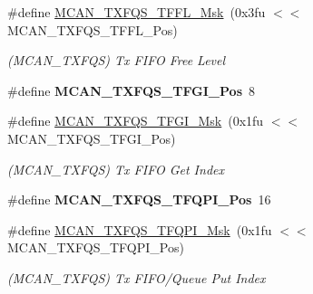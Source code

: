 \begin{DoxyCompactItemize}
\item 
\mbox{\label{group__SAMV71__MCAN_ga499e086f227cc16cb1efafb8ac11cf57}} 
\#define \mbox{\hyperlink{group__SAMV71__MCAN_ga499e086f227cc16cb1efafb8ac11cf57}{M\+C\+A\+N\+\_\+\+T\+X\+F\+Q\+S\+\_\+\+T\+F\+F\+L\+\_\+\+Msk}}~(0x3fu $<$$<$ M\+C\+A\+N\+\_\+\+T\+X\+F\+Q\+S\+\_\+\+T\+F\+F\+L\+\_\+\+Pos)
\begin{DoxyCompactList}\small\item\em (M\+C\+A\+N\+\_\+\+T\+X\+F\+QS) Tx F\+I\+FO Free Level \end{DoxyCompactList}\item 
\mbox{\label{group__SAMV71__MCAN_ga253f4a1ad728a7925be42b09de6bd7bc}} 
\#define {\bfseries M\+C\+A\+N\+\_\+\+T\+X\+F\+Q\+S\+\_\+\+T\+F\+G\+I\+\_\+\+Pos}~8
\item 
\mbox{\label{group__SAMV71__MCAN_ga8541e1347a93d7b3b6fe7e9e8e7de8bf}} 
\#define \mbox{\hyperlink{group__SAMV71__MCAN_ga8541e1347a93d7b3b6fe7e9e8e7de8bf}{M\+C\+A\+N\+\_\+\+T\+X\+F\+Q\+S\+\_\+\+T\+F\+G\+I\+\_\+\+Msk}}~(0x1fu $<$$<$ M\+C\+A\+N\+\_\+\+T\+X\+F\+Q\+S\+\_\+\+T\+F\+G\+I\+\_\+\+Pos)
\begin{DoxyCompactList}\small\item\em (M\+C\+A\+N\+\_\+\+T\+X\+F\+QS) Tx F\+I\+FO Get Index \end{DoxyCompactList}\item 
\mbox{\label{group__SAMV71__MCAN_ga9de1bbc0abff0a0c37f0abfb8c87b3d9}} 
\#define {\bfseries M\+C\+A\+N\+\_\+\+T\+X\+F\+Q\+S\+\_\+\+T\+F\+Q\+P\+I\+\_\+\+Pos}~16
\item 
\mbox{\label{group__SAMV71__MCAN_ga31ac3924a17c4c89cfa5386249c23fa3}} 
\#define \mbox{\hyperlink{group__SAMV71__MCAN_ga31ac3924a17c4c89cfa5386249c23fa3}{M\+C\+A\+N\+\_\+\+T\+X\+F\+Q\+S\+\_\+\+T\+F\+Q\+P\+I\+\_\+\+Msk}}~(0x1fu $<$$<$ M\+C\+A\+N\+\_\+\+T\+X\+F\+Q\+S\+\_\+\+T\+F\+Q\+P\+I\+\_\+\+Pos)
\begin{DoxyCompactList}\small\item\em (M\+C\+A\+N\+\_\+\+T\+X\+F\+QS) Tx F\+I\+F\+O/\+Queue Put Index \end{DoxyCompactList}\item 
\mbox{\label{group__SAMV71__MCAN_ga34a2df3c3ed0ea9a3f3bd9609fac70b4}} 
$$
\end{DoxyCompactItemize}

